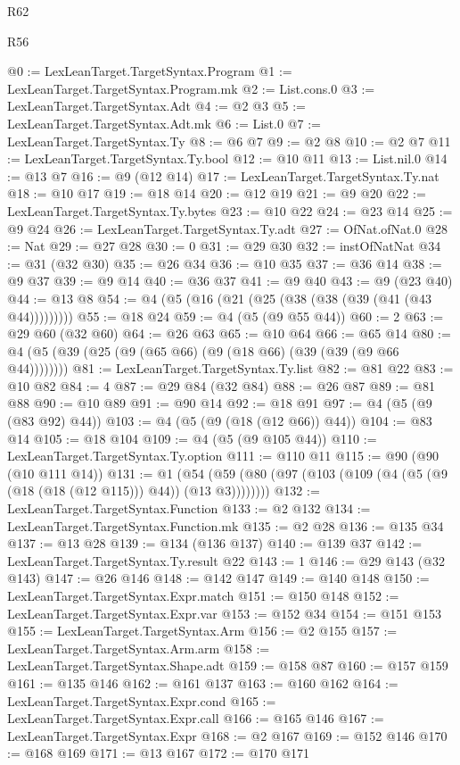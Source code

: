 \begin{lexlean}{R62}
\begin{lexlean}{R56}
\begin{coremodule}
{{{{{{{{{{{{{{{{{{{{{{{{{{{{{{{{{{{{{{{{{{{{{{{{{{{{{{{{{{{{{{{{{{{{{{{{{{{{{{{{{{{{{{{{{{{{{{{{{{{{{{{{{{{{{{{{{{{{{{{{{{{{{{{{{{{{{{{{{{{{{{{{{{{{{{{{{{{{{{{{{{{{{{{{{{{{{{{{{{{{{{{{{{{{{{{{{{{{{{{{{{{{{{{{{{{@0 := LexLeanTarget.TargetSyntax.Program
@1 := LexLeanTarget.TargetSyntax.Program.mk
@2 := List.cons.{0}
@3 := LexLeanTarget.TargetSyntax.Adt
@4 := @2 @3
@5 := LexLeanTarget.TargetSyntax.Adt.mk
@6 := List.{0}
@7 := LexLeanTarget.TargetSyntax.Ty
@8 := @6 @7
@9 := @2 @8
@10 := @2 @7
@11 := LexLeanTarget.TargetSyntax.Ty.bool
@12 := @10 @11
@13 := List.nil.{0}
@14 := @13 @7
@16 := @9 (@12 @14)
@17 := LexLeanTarget.TargetSyntax.Ty.nat
@18 := @10 @17
@19 := @18 @14
@20 := @12 @19
@21 := @9 @20
@22 := LexLeanTarget.TargetSyntax.Ty.bytes
@23 := @10 @22
@24 := @23 @14
@25 := @9 @24
@26 := LexLeanTarget.TargetSyntax.Ty.adt
@27 := OfNat.ofNat.{0}
@28 := Nat
@29 := @27 @28
@30 := 0
@31 := @29 @30
@32 := instOfNatNat
@34 := @31 (@32 @30)
@35 := @26 @34
@36 := @10 @35
@37 := @36 @14
@38 := @9 @37
@39 := @9 @14
@40 := @36 @37
@41 := @9 @40
@43 := @9 (@23 @40)
@44 := @13 @8
@54 := @4 (@5 (@16 (@21 (@25 (@38 (@38 (@39 (@41 (@43 @44)))))))))
@55 := @18 @24
@59 := @4 (@5 (@9 @55 @44))
@60 := 2
@63 := @29 @60 (@32 @60)
@64 := @26 @63
@65 := @10 @64
@66 := @65 @14
@80 := @4 (@5 (@39 (@25 (@9 (@65 @66) (@9 (@18 @66) (@39 (@39 (@9 @66 @44))))))))
@81 := LexLeanTarget.TargetSyntax.Ty.list
@82 := @81 @22
@83 := @10 @82
@84 := 4
@87 := @29 @84 (@32 @84)
@88 := @26 @87
@89 := @81 @88
@90 := @10 @89
@91 := @90 @14
@92 := @18 @91
@97 := @4 (@5 (@9 (@83 @92) @44))
@103 := @4 (@5 (@9 (@18 (@12 @66)) @44))
@104 := @83 @14
@105 := @18 @104
@109 := @4 (@5 (@9 @105 @44))
@110 := LexLeanTarget.TargetSyntax.Ty.option
@111 := @110 @11
@115 := @90 (@90 (@10 @111 @14))
@131 := @1 (@54 (@59 (@80 (@97 (@103 (@109 (@4 (@5 (@9 (@18 (@18 (@12 @115))) @44)) (@13 @3))))))))
@132 := LexLeanTarget.TargetSyntax.Function
@133 := @2 @132
@134 := LexLeanTarget.TargetSyntax.Function.mk
@135 := @2 @28
@136 := @135 @34
@137 := @13 @28
@139 := @134 (@136 @137)
@140 := @139 @37
@142 := LexLeanTarget.TargetSyntax.Ty.result @22
@143 := 1
@146 := @29 @143 (@32 @143)
@147 := @26 @146
@148 := @142 @147
@149 := @140 @148
@150 := LexLeanTarget.TargetSyntax.Expr.match
@151 := @150 @148
@152 := LexLeanTarget.TargetSyntax.Expr.var
@153 := @152 @34
@154 := @151 @153
@155 := LexLeanTarget.TargetSyntax.Arm
@156 := @2 @155
@157 := LexLeanTarget.TargetSyntax.Arm.arm
@158 := LexLeanTarget.TargetSyntax.Shape.adt
@159 := @158 @87
@160 := @157 @159
@161 := @135 @146
@162 := @161 @137
@163 := @160 @162
@164 := LexLeanTarget.TargetSyntax.Expr.cond
@165 := LexLeanTarget.TargetSyntax.Expr.call
@166 := @165 @146
@167 := LexLeanTarget.TargetSyntax.Expr
@168 := @2 @167
@169 := @152 @146
@170 := @168 @169
@171 := @13 @167
@172 := @170 @171
}}}}}}}}}}}}}}}}}}}}}}}}}}}}}}}}}}}}}}}}}}}}}}}}}}}}}}}}}}}}}}}}}}}}}}}}}}}}}}}}}}}}}}}}}}}}}}}}}}}}}}}}}}}}}}}}}}}}}}}}}}}}}}}}}}}}}}}}}}}}}}}}}}}}}}}}}}}}}}}}}}}}}}}}}}}}}}}}}}}}}}}}}}}}}}}}}}}}}}}}}}}}}}}}}}}
\end{coremodule}
\end{lexlean}
\end{lexlean}
